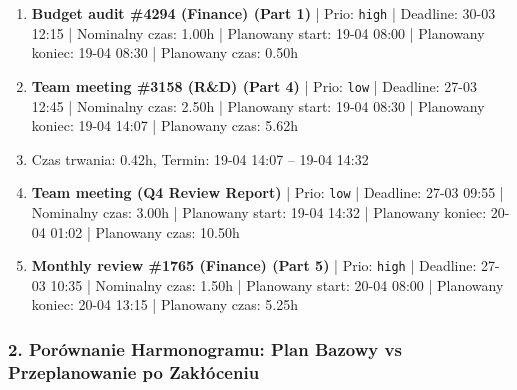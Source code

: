{\begin{enumerate}
  \item [\textbf{14619}] \textbf{Budget audit \#4294 (Finance) (Part 1)} | Prio: \texttt{high} | Deadline: 30-03 12:15 | Nominalny czas: 1.00h | Planowany start: 19-04 08:00 | Planowany koniec: 19-04 08:30 | Planowany czas: 0.50h
  \item [\textbf{14688}] \textbf{Team meeting \#3158 (R\&D) (Part 4)} | Prio: \texttt{low} | Deadline: 27-03 12:45 | Nominalny czas: 2.50h | Planowany start: 19-04 08:30 | Planowany koniec: 19-04 14:07 | Planowany czas: 5.62h
  \item [\textbf{PRZERWA}] Czas trwania: 0.42h, Termin: 19-04 14:07 -- 19-04 14:32
  \item [\textbf{14682}] \textbf{Team meeting (Q4 Review Report)} | Prio: \texttt{low} | Deadline: 27-03 09:55 | Nominalny czas: 3.00h | Planowany start: 19-04 14:32 | Planowany koniec: 20-04 01:02 | Planowany czas: 10.50h
  \item [\textbf{14627}] \textbf{Monthly review \#1765 (Finance) (Part 5)} | Prio: \texttt{high} | Deadline: 27-03 10:35 | Nominalny czas: 1.50h | Planowany start: 20-04 08:00 | Planowany koniec: 20-04 13:15 | Planowany czas: 5.25h
\end{enumerate}
}

\subsubsection*{2. Porównanie Harmonogramu: Plan Bazowy vs Przeplanowanie po Zakłóceniu}

